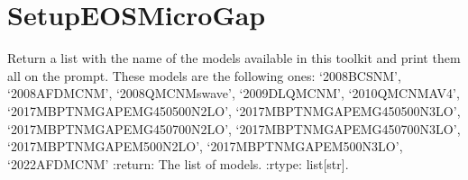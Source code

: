 \documentclass[letterpaper,10pt,english]{sphinxmanual}
\begin{document}
\sphinxstepscope


\section{SetupEOSMicroGap}
\label{\detokenize{source/api/setup_matter_micro_gap:setupeosmicrogap}}\label{\detokenize{source/api/setup_matter_micro_gap::doc}}\label{\detokenize{source/api/setup_matter_micro_gap:module-nucleardatapy.matter.setup_micro_gap}}

\begin{fulllineitems}
\label{\detokenize{source/api/setup_matter_micro_gap:nucleardatapy.matter.setup_micro_gap.micro_gap_models}}
\pysigstartsignatures
{}
\pysigstopsignatures
\sphinxAtStartPar
Return a list with the name of the models available in this toolkit and     print them all on the prompt. These models are the following ones:     ‘2008\sphinxhyphen{}BCS\sphinxhyphen{}NM’, ‘2008\sphinxhyphen{}AFDMC\sphinxhyphen{}NM’,     ‘2008\sphinxhyphen{}QMC\sphinxhyphen{}NM\sphinxhyphen{}swave’, ‘2009\sphinxhyphen{}DLQMC\sphinxhyphen{}NM’, ‘2010\sphinxhyphen{}QMC\sphinxhyphen{}NM\sphinxhyphen{}AV4’, ‘2017\sphinxhyphen{}MBPT\sphinxhyphen{}NM\sphinxhyphen{}GAP\sphinxhyphen{}EMG\sphinxhyphen{}450\sphinxhyphen{}500\sphinxhyphen{}N2LO’,     ‘2017\sphinxhyphen{}MBPT\sphinxhyphen{}NM\sphinxhyphen{}GAP\sphinxhyphen{}EMG\sphinxhyphen{}450\sphinxhyphen{}500\sphinxhyphen{}N3LO’, ‘2017\sphinxhyphen{}MBPT\sphinxhyphen{}NM\sphinxhyphen{}GAP\sphinxhyphen{}EMG\sphinxhyphen{}450\sphinxhyphen{}700\sphinxhyphen{}N2LO’,     ‘2017\sphinxhyphen{}MBPT\sphinxhyphen{}NM\sphinxhyphen{}GAP\sphinxhyphen{}EMG\sphinxhyphen{}450\sphinxhyphen{}700\sphinxhyphen{}N3LO’, ‘2017\sphinxhyphen{}MBPT\sphinxhyphen{}NM\sphinxhyphen{}GAP\sphinxhyphen{}EM\sphinxhyphen{}500\sphinxhyphen{}N2LO’, ‘2017\sphinxhyphen{}MBPT\sphinxhyphen{}NM\sphinxhyphen{}GAP\sphinxhyphen{}EM\sphinxhyphen{}500\sphinxhyphen{}N3LO’,     ‘2022\sphinxhyphen{}AFDMC\sphinxhyphen{}NM’
:return: The list of models.
:rtype: list{[}str{]}.

\end{fulllineitems}
\end{document}
